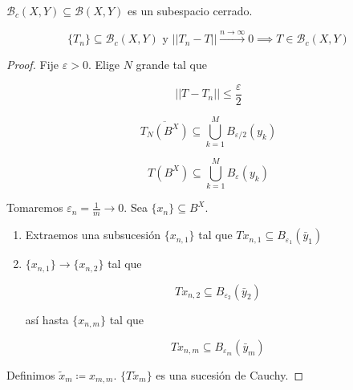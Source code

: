  \begin{ftheorem}
    $\mathcal{B}_c(X,Y)\subseteq \mathcal{B}(X,Y)$ es un subespacio cerrado. 

    \[\{T_n\}\subseteq \mathcal{B}_c(X,Y)\text{ y }||T_n-T||\xrightarrow{n\to\infty} 0\implies T\in \mathcal{B}_c(X,Y)\]
 \end{ftheorem}

 \begin{proof}






    Fije $\varepsilon>0$. Elige $N$ grande tal que 

    \[||T-T_n||\leq \frac{\varepsilon}{2}\]

    \[\overline{T_N(B^X)}\subseteq \bigcup_{k=1}^M B_{\varepsilon/2}(y_k)\]

    \[T(B^X)\subseteq \bigcup_{k=1}^M B_{\varepsilon}(y_k)\]

    Tomaremos $\varepsilon_n=\frac{1}{m}\to 0$. Sea $\{x_n\}\subseteq B^X$.

    \begin{enumerate}
        \item Extraemos una subsucesión $\{x_{n,1}\}$ tal que $Tx_{n,1}\subseteq B_{\varepsilon_1}(\bar y_1)$
        
        \item $\{x_{n,1}\}\to\{x_{n,2}\}$ tal que 
        
        \[Tx_{n,2}\subseteq B_{\varepsilon_2}(\bar y_2)\]

        así hasta $\{x_{n,m}\}$ tal que

        \[Tx_{n,m}\subseteq B_{\varepsilon_m}(\bar y_m)\]
    \end{enumerate}

    Definimos $\tilde x_m\coloneqq x_{m,m}$. $\{T\tilde x_m\}$ es una sucesión de Cauchy.
 \end{proof}

